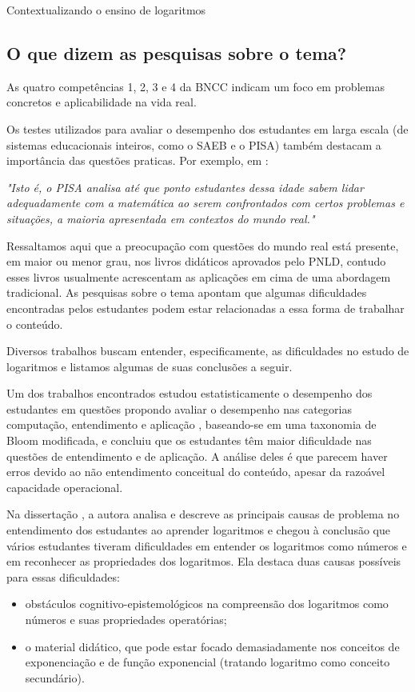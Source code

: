 \begin{apresentacao}{Contextualizando o ensino de logaritmos}
\subsection*{O que dizem as pesquisas sobre o tema?}

As quatro competências 1, 2, 3 e 4 da BNCC \citep{BNCC2018}  indicam um foco em problemas concretos e aplicabilidade na vida real. 

Os testes utilizados para avaliar o desempenho dos estudantes em larga escala (de sistemas educacionais inteiros, como o SAEB e o PISA) também destacam a importância das questões praticas. Por exemplo, em \cite[p.139]{OCDE2016}:

\columnbreak
\textit{"Isto é, o PISA analisa até que ponto estudantes dessa idade sabem lidar adequadamente com a matemática ao serem confrontados com certos problemas e situações, a maioria apresentada em contextos do mundo real."}

Ressaltamos aqui que a preocupação com questões do mundo real está presente, em maior ou menor grau, nos livros didáticos aprovados pelo PNLD, contudo esses livros usualmente acrescentam as aplicações em cima de uma abordagem tradicional. As pesquisas sobre o tema apontam que algumas dificuldades encontradas pelos estudantes podem estar relacionadas a essa forma de trabalhar o conteúdo.



	Diversos trabalhos buscam entender, especificamente, as dificuldades no estudo de logaritmos e listamos algumas de suas conclusões a seguir.
	 
	Um dos trabalhos encontrados \cite{Liang2005} estudou estatisticamente o desempenho dos estudantes em questões propondo avaliar o desempenho nas categorias computação, entendimento e aplicação , baseando-se em uma taxonomia de Bloom modificada, e concluiu que os estudantes têm maior dificuldade nas questões de entendimento e de aplicação. A análise deles é que parecem haver erros devido ao não entendimento conceitual do conteúdo, apesar da razoável capacidade operacional.

Na dissertação \cite{Berezovski2004}, a autora analisa e descreve as principais causas de problema no entendimento dos estudantes ao aprender logaritmos e chegou à conclusão que vários estudantes tiveram dificuldades em entender os logaritmos como números e em reconhecer as propriedades dos logaritmos. Ela destaca duas causas possíveis para essas dificuldades:
	\begin{itemize}
	\item obstáculos cognitivo-epistemológicos na compreensão dos logaritmos como números e suas propriedades operatórias;
	\item o material didático, que pode estar focado demasiadamente nos conceitos de exponenciação e de função exponencial (tratando logaritmo como conceito secundário).
	\end{itemize}


\end{apresentacao}
